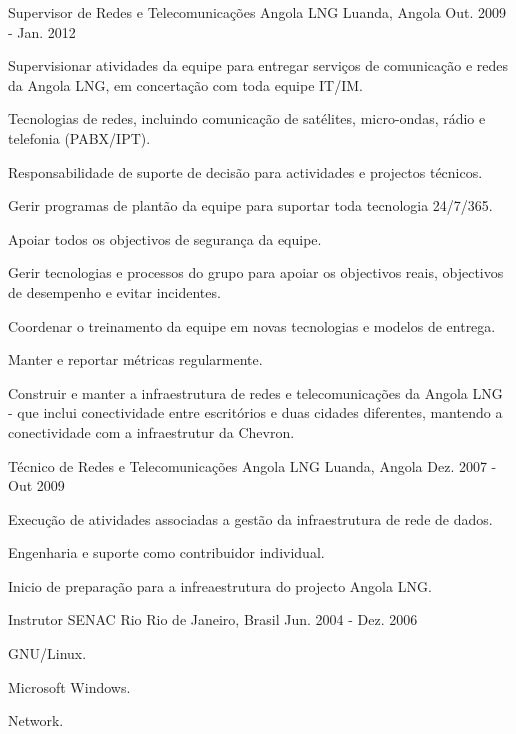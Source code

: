 \begin{cventries}
\cventry
{Supervisor de Redes e Telecomunicações} %
{Angola LNG} %
{Luanda, Angola} %
{Out. 2009 - Jan. 2012} %
{ %
\begin{cvitems}
\item {Supervisionar atividades da equipe para entregar serviços de comunicação e redes da Angola LNG, em concertação com toda equipe IT/IM.}
\item {Tecnologias de redes, incluindo comunicação de satélites, micro-ondas, rádio e telefonia (PABX/IPT).}
\item {Responsabilidade de suporte de decisão para actividades e projectos técnicos.}
\item {Gerir programas de plantão da equipe para suportar toda tecnologia 24/7/365.}
\item {Apoiar todos os objectivos de segurança da equipe.}
\item {Gerir tecnologias e processos do grupo para apoiar os objectivos reais, objectivos de desempenho e evitar incidentes.}
\item {Coordenar o treinamento da equipe em novas tecnologias e modelos de entrega.}
\item {Manter e reportar métricas regularmente.}
\item {Construir e manter a infraestrutura de redes e telecomunicações da Angola LNG - que inclui conectividade entre escritórios e duas cidades diferentes, mantendo a conectividade com a infraestrutur da Chevron.}
\end{cvitems} 
}


\cventry
{Técnico de Redes e Telecomunicações} %
{Angola LNG} %
{Luanda, Angola} %
{Dez. 2007 - Out 2009} %
{ %
\begin{cvitems}
\item {Execução de atividades associadas a gestão da infraestrutura de rede de dados.}
\item {Engenharia e suporte como contribuidor individual.}
\item {Inicio de preparação para a infreaestrutura do projecto Angola LNG.}
\end{cvitems}
}


\cventry
{Instrutor} %
{SENAC Rio} %
{Rio de Janeiro, Brasil} %
{Jun. 2004 - Dez. 2006} %
{ %
\begin{cvitems}
\item {GNU/Linux.}
\item {Microsoft Windows.}
\item {Network.}
\end{cvitems}
}



\end{cventries}
